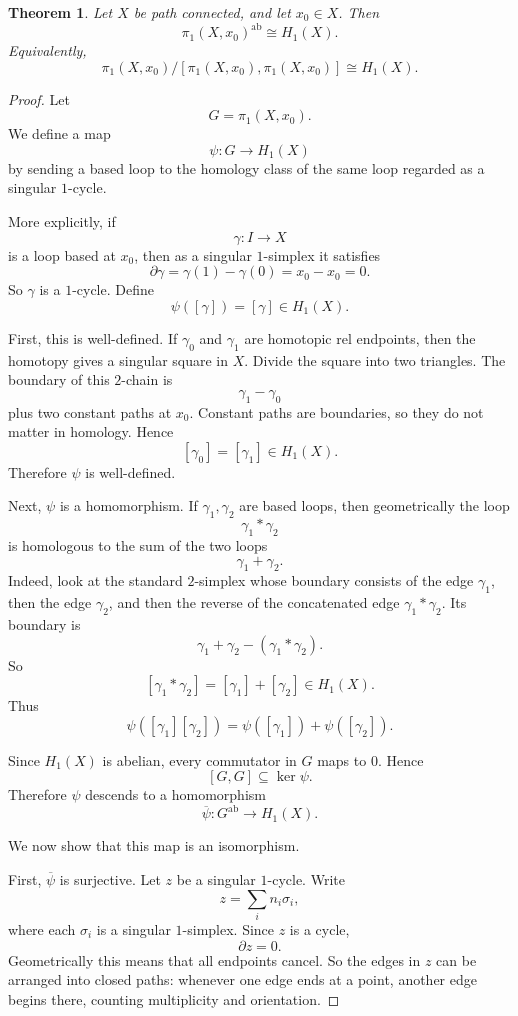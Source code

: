 \documentclass[11pt,a4paper]{article}
\theoremstyle{definition}
\theoremstyle{plain}
\newtheorem{theorem}[definition]{Theorem}
\theoremstyle{remark}
\newcommand{\1}{\mathbbm{1}}
\begin{document}
\begin{theorem}
Let $X$ be path connected, and let $x_0 \in X$. Then
\[
\pi_1(X,x_0)^{\mathrm{ab}} \cong H_1(X).
\]
Equivalently,
\[
\pi_1(X,x_0)/[\pi_1(X,x_0),\pi_1(X,x_0)] \cong H_1(X).
\]
\end{theorem}

\begin{proof}
Let
\[
G = \pi_1(X,x_0).
\]
We define a map
\[
\psi : G \longrightarrow H_1(X)
\]
by sending a based loop to the homology class of the same loop regarded as a singular
$1$-cycle.

More explicitly, if
\[
\gamma : I \to X
\]
is a loop based at $x_0$, then as a singular $1$-simplex it satisfies
\[
\partial \gamma = \gamma(1)-\gamma(0)=x_0-x_0=0.
\]
So $\gamma$ is a $1$-cycle. Define
\[
\psi([\gamma]) = [\gamma] \in H_1(X).
\]

First, this is well-defined. If $\gamma_0$ and $\gamma_1$ are homotopic rel endpoints, then the homotopy gives a singular square in $X$. Divide the square into two triangles. The boundary of this $2$-chain is
\[
\gamma_1-\gamma_0
\]
plus two constant paths at $x_0$. Constant paths are boundaries, so they do not matter in homology. Hence
\[
[\gamma_0]=[\gamma_1]\in H_1(X).
\]
Therefore $\psi$ is well-defined.

Next, $\psi$ is a homomorphism. If $\gamma_1,\gamma_2$ are based loops, then geometrically the loop
\[
\gamma_1 * \gamma_2
\]
is homologous to the sum of the two loops
\[
\gamma_1+\gamma_2.
\]
Indeed, look at the standard $2$-simplex whose boundary consists of the edge $\gamma_1$,
then the edge $\gamma_2$, and then the reverse of the concatenated edge
$\gamma_1 * \gamma_2$. Its boundary is
\[
\gamma_1+\gamma_2-(\gamma_1 * \gamma_2).
\]
So
\[
[\gamma_1 * \gamma_2]=[\gamma_1]+[\gamma_2]\in H_1(X).
\]
Thus
\[
\psi([\gamma_1][\gamma_2])
=
\psi([\gamma_1])+\psi([\gamma_2]).
\]

Since $H_1(X)$ is abelian, every commutator in $G$ maps to $0$. Hence
\[
[G,G]\subseteq \ker \psi.
\]
Therefore $\psi$ descends to a homomorphism
\[
\overline{\psi}:G^{\mathrm{ab}}\longrightarrow H_1(X).
\]

We now show that this map is an isomorphism.

First, $\overline{\psi}$ is surjective. Let $z$ be a singular $1$-cycle. Write
\[
z=\sum_i n_i\sigma_i,
\]
where each $\sigma_i$ is a singular $1$-simplex. Since $z$ is a cycle,
\[
\partial z=0.
\]
Geometrically this means that all endpoints cancel. So the edges in $z$ can be arranged into
closed paths: whenever one edge ends at a point, another edge begins there, counting
multiplicity and orientation.


\end{proof}
\end{document}
